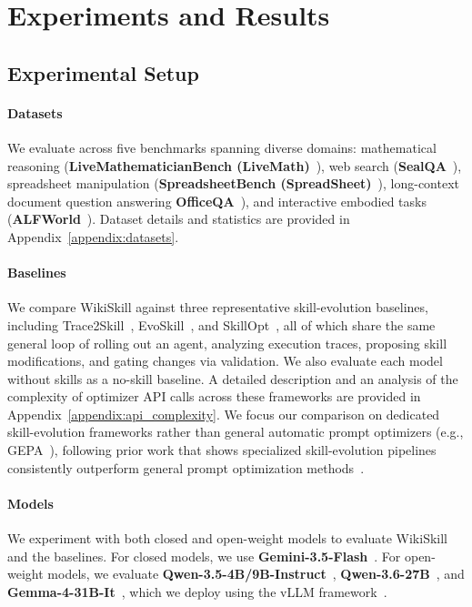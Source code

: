 \documentclass[11pt, a4paper, copyright, gr]{google}
\newcommand{\method}{WikiSkill\xspace}
\begin{document}
\section{Experiments and Results}
\label{sec:experiments_and_results}

\subsection{Experimental Setup}

\paragraph{Datasets} We evaluate across five benchmarks spanning diverse domains: mathematical reasoning (\textbf{LiveMathematicianBench (LiveMath)}~\citep{he2026livemathematicianbench}), web search (\textbf{SealQA}~\citep{pham2026sealqa}), spreadsheet manipulation (\textbf{SpreadsheetBench (SpreadSheet)}~\citep{ma2024spreadsheetbench}), long-context document question answering \textbf{OfficeQA}~\citep{singhvi2025officeqa}), and interactive embodied tasks  (\textbf{ALFWorld}~\citep{shridhar2021alfworld}). Dataset details and statistics are provided in Appendix~\ref{appendix:datasets}.

\paragraph{Baselines} We compare \method against three representative skill-evolution baselines, including Trace2Skill~\citep{ni2026trace2skill}, EvoSkill~\citep{alzubi2026evoskill}, and SkillOpt~\citep{yang2026skillopt}, all of which share the same general loop of rolling out an agent, analyzing execution traces, proposing skill modifications, and gating changes via validation. We also evaluate each model without skills as a no-skill baseline. A detailed description and an analysis of the complexity of optimizer API calls across these frameworks are provided in Appendix~\ref{appendix:api_complexity}. We focus our comparison on dedicated skill-evolution frameworks rather than general automatic prompt optimizers (e.g., GEPA~\citep{agrawal2026gepa}), following prior work that shows specialized skill-evolution pipelines consistently outperform general prompt optimization methods~\citep{yang2026skillopt}.

\paragraph{Models} We experiment with both closed and open-weight models to evaluate \method and the baselines. For closed models, we use \textbf{Gemini-3.5-Flash}~\citep{googledeepmind2026gemini35flash}. For open-weight models, we evaluate \textbf{Qwen-3.5-4B/9B-Instruct}~\citep{qwen2026qwen35}, \textbf{Qwen-3.6-27B}~\citep{qwen2026qwen36}, and \textbf{Gemma-4-31B-It}~\citep{team2026gemma}, which we deploy using the vLLM framework~\citep{10.1145/3600006.3613165}. 
\end{document}
